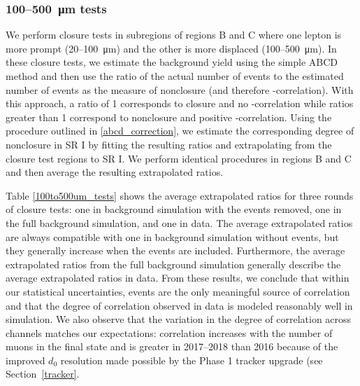 \subsubsection{\num{100}--\SI{500}{\um} tests}
We perform closure tests in subregions of regions B and C where one lepton is more prompt (\num{20}--\SI{100}{\um}) and the other is more displaced (\num{100}--\SI{500}{\um}). In these closure tests, we estimate the background yield using the simple ABCD method and then use the ratio of the actual number of events to the estimated number of events as the measure of nonclosure (and therefore \ada-\adb correlation). With this approach, a ratio of 1 corresponds to closure and no \ada-\adb correlation while ratios greater than 1 correspond to nonclosure and positive \ada-\adb correlation. Using the procedure outlined in \ref{abcd_correction}, we estimate the corresponding degree of nonclosure in SR I by fitting the resulting ratios and extrapolating from the closure test regions to SR I. We perform identical procedures in regions B and C and then average the resulting extrapolated ratios.

Table \ref{100to500um_tests} shows the average extrapolated ratios for three rounds of closure tests: one in background simulation with the \ztautaull events removed, one in the full background simulation, and one in data. The average extrapolated ratios are always compatible with one in background simulation without \ztautaull events, but they generally increase when the \ztautaull events are included. Furthermore, the average extrapolated ratios from the full background simulation generally describe the average extrapolated ratios in data. From these results, we conclude that within our statistical uncertainties, \ztautaull events are the only meaningful source of correlation and that the degree of correlation observed in data is modeled reasonably well in simulation. We also observe that the variation in the degree of correlation across channels matches our expectations: correlation increases with the number of muons in the final state and is greater in 2017--2018 than 2016 because of the improved $d_0$ resolution made possible by the Phase 1 tracker upgrade (see Section~\ref{tracker}.



